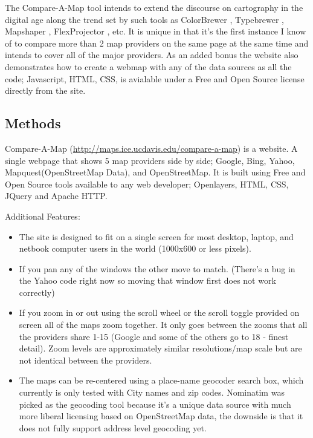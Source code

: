 \documentclass[12pt,letterpaper]{article}
\begin{document}
	  The Compare-A-Map tool intends to extend the discourse on cartography in the digital age along the trend set by such tools as ColorBrewer \parencite{Harrower2003}, Typebrewer \parencite{Sheesley2008}, Mapshaper \parencite{Bloch2006}, FlexProjector \parencite{Jenny2010} , etc. It is unique in that it's the first instance I know of to compare more than 2 map providers on the same page at the same time and intends to cover all of the major providers. As an added bonus the website also demonstrates how to create a webmap with any of the data sources as all the code; Javascript, HTML, CSS, is avialable under a Free and Open Source license directly from the site.
	


\subsection{Methods}
Compare-A-Map (\url{http://maps.ice.ucdavis.edu/compare-a-map}) is a website. A single webpage that shows 5 map providers side by side; Google, Bing, Yahoo, Mapquest(OpenStreetMap Data), and OpenStreetMap. It is built using Free and Open Source tools available to any web developer; Openlayers, HTML, CSS, JQuery and Apache HTTP.

Additional Features:
\begin{itemize}
\item The site is designed to fit on a single screen for most desktop, laptop, and netbook computer users in the world (1000x600 or less pixels).
\item If you pan any of the windows the other move to match. (There's a bug in the Yahoo code right now so moving that window first does not work correctly)
\item If you zoom in or out using the scroll wheel or the scroll toggle provided on screen all of the maps zoom together. It only goes between the zooms that all the providers share 1-15 (Google and some of the others go to 18 - finest detail). Zoom levels are approximately similar resolutions/map scale but are not identical between the providers.
\item The maps can be re-centered using a place-name geocoder search box, which currently is only tested with City names and zip codes. Nominatim \parencite{Mapquest2012} was picked as the geocoding tool because it's a unique data source with much more liberal licensing based on OpenStreetMap data, the downside is that it does not fully support address level geocoding yet. 
\end{itemize}
\end{document}
